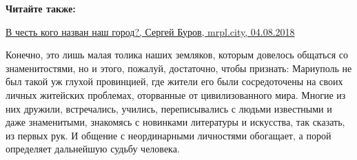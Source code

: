 \textbf{Читайте также:} 

\href{https://archive.org/details/04_08_2018.sergij_burov.mrpl_city.v_chest_kogo_nazvan_nash_gorod}{%
В честь кого назван наш город?, Сергей Буров, mrpl.city, 04.08.2018}

Конечно, это лишь малая толика наших земляков, которым довелось общаться со
знаменитостями, но и этого, пожалуй, достаточно, чтобы признать: Мариуполь не
был такой уж глухой провинцией, где жители его были сосредоточены на своих
личных житейских проблемах, оторванные от цивилизованного мира. Многие из них
дружили, встречались, учились, переписывались с людьми известными и даже
знаменитыми, знакомясь с новинками литературы и искусства, так сказать, из
первых рук. И общение с неординарными личностями обогащает, а порой определяет
дальнейшую судьбу человека.
